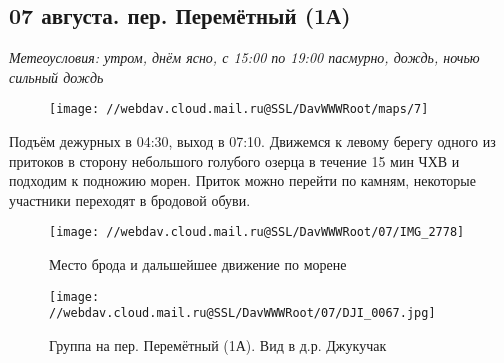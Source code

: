 \subsection{07 августа. пер. Перемётный (1А)}
\textit{Метеоусловия: утром, днём ясно, с 15:00 по 19:00 пасмурно, дождь, ночью сильный дождь}

\begin{figure}[h!]
	\centering
	\texttt{[image: //webdav.cloud.mail.ru@SSL/DavWWWRoot/maps/7]}
	\label{fig:mini_18}
\end{figure}

Подъём дежурных в 04:30, выход в 07:10. Движемся к левому берегу одного из притоков в сторону небольшого голубого озерца в течение 15 мин ЧХВ и подходим к подножию морен. Приток можно перейти по камням, некоторые участники переходят в бродовой обуви.

\begin{figure}[h!]
	\centering
	\texttt{[image: //webdav.cloud.mail.ru@SSL/DavWWWRoot/07/IMG\_2778]}
	\caption{Место брода и дальшейшее движение по морене}
	\label{fig:img2778}
\end{figure}

\begin{figure}[h!]
	\centering
	\texttt{[image: //webdav.cloud.mail.ru@SSL/DavWWWRoot/07/DJI\_0067.jpg]}
	\caption{Группа на пер. Перемётный (1А). Вид в д.р. Джукучак}
	\label{fig:DJI_0067.jpg}
\end{figure}


\clearpage